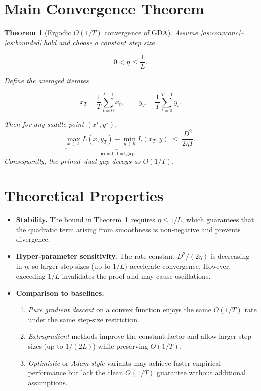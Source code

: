 \documentclass{article}
\newtheorem{theorem}{Theorem}
\begin{document}
\section*{Main Convergence Theorem}
\begin{theorem}[Ergodic $O(1/T)$ convergence of GDA]\label{thm:main}
Assume \ref{as:convconc}–\ref{as:bounded} hold and choose a constant step size  

\[
0<\eta\le\frac{1}{L}.
\]

Define the averaged iterates  

\[
\bar x_{T}= \frac{1}{T}\sum_{t=0}^{T-1}x_{t},\qquad 
\bar y_{T}= \frac{1}{T}\sum_{t=0}^{T-1}y_{t}.
\]

Then for any saddle point $(x^{\star},y^{\star})$,
\[
\underbrace{\max_{x\in\mathcal{X}}L(x,\bar y_{T})-\min_{y\in\mathcal{Y}}L(\bar x_{T},y)}_{\displaystyle\text{primal–dual gap}}
\;\le\;
\frac{D^{2}}{2\eta T}.
\]
Consequently, the primal–dual gap decays as $O(1/T)$.
\end{theorem}

\section*{Theoretical Properties}
\begin{itemize}
\item \textbf{Stability.} The bound in Theorem~\ref{thm:main} requires $\eta\le1/L$, which guarantees that the quadratic term arising from smoothness is non‑negative and prevents divergence.
\item \textbf{Hyper‑parameter sensitivity.} The rate constant $D^{2}/(2\eta)$ is decreasing in $\eta$, so larger step sizes (up to $1/L$) accelerate convergence. However, exceeding $1/L$ invalidates the proof and may cause oscillations.
\item \textbf{Comparison to baselines.}
    \begin{enumerate}
        \item \emph{Pure gradient descent} on a convex function enjoys the same $O(1/T)$ rate under the same step‑size restriction.
        \item \emph{Extragradient} methods improve the constant factor and allow larger step sizes (up to $1/(2L)$) while preserving $O(1/T)$.
        \item \emph{Optimistic} or \emph{Adam‑style} variants may achieve faster empirical performance but lack the clean $O(1/T)$ guarantee without additional assumptions.
    \end{enumerate}
\end{itemize}
\end{document}
